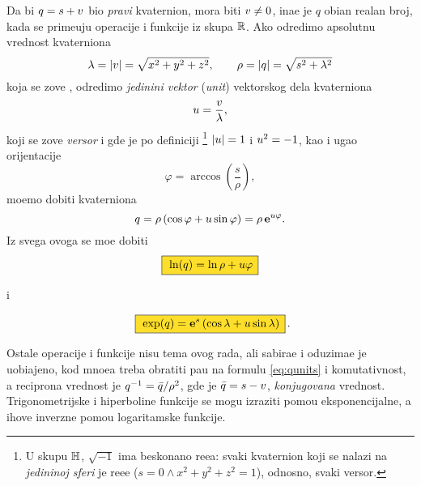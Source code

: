 Da bi $q=s+{v}$ bio {\sl pravi\/} kvaternion, mora biti ${v}\ne0$, ina{\cv}e je $q$ obi{\cv}an realan broj, 
kada se prime{\nj}uju operacije i funkcije iz skupa ${\mathbb R}$.
Ako odredimo apsolutnu vrednost kvaterniona
$$
\lambda = {\vert{v}\vert} = \sqrt{\mathstrut x^2+y^2+z^2},\qquad
\rho = {\vert q\vert} = \sqrt{\mathstrut s^2+\lambda^2}
$$
koja se zove {\sl {}\/}, odredimo
{\sl jedini{\cv}ni vektor\/} ({\sl unit\/}) vektorskog dela kvaterniona
$$
{u} = \frac {{v}}\lambda, 
$$
koji se zove {\sl versor\/}
i gde je po definiciji%
\footnote{U skupu ${\mathbb H}$, $\sqrt{-1}$ ima beskona{\cv}no re{\sv}e{\nj}a:
svaki kvaternion koji se nalazi na {\sl jedini{\cv}noj sferi\/} je re{\sv}e{\nj}e
($s=0\land x^2+y^2+z^2=1$), odnosno, svaki versor.} 
${\vert{u}\vert}=1$ i  ${u}^2=-1$,
kao i ugao orijentacije
$$
\varphi = \arccos\left( \frac s\rho \right),
$$
mo{\zv}emo dobiti  kvaterniona
\begin{equation}
q
=\rho\,(\cos\varphi + {u}\sin\varphi)
=\rho\,{\bf e}^{{u}\varphi}.
\end{equation}
Iz svega ovoga se mo{\zv}e dobiti
\begin{equation}\index{ln@$\ln$}
    \okvir{\ln(q)  = \ln\rho + \uv\varphi}
\end{equation}
\centerline{i}
\begin{equation}\index{exp@$\exp$}
    \okvir{\exp(q) = \e^s \left( \cos\lambda + \uv\sin\lambda \right)}\rlap{.}
\end{equation}

\medskip

\danger
Ostale operacije i funkcije nisu tema ovog rada, ali sabira{\nj}e i oduzima{\nj}e
je uobi\-{\cv}a\-jeno, kod mno{\zv}e{\nj}a treba obratiti pa{\zv}{\nj}u na formulu \eqref{eq:qunits} i
komutativnost, a reci\-pro{\cv}na vrednost je
$q^{-1}={\bar q}/\rho^2$, gde je ${\bar q}=s-{v}$, {\sl konjugovana\/} vrednost. 
Tri\-gono\-metrijske i hiperboli{\cv}ne funkcije se mogu izraziti pomo{\cc}u eksponencijalne,
a {\nj}ihove inverzne pomo{\cc}u logaritamske funkcije.\par

